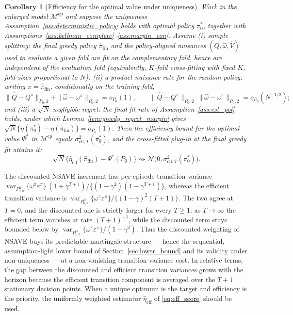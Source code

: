 \documentclass[12pt]{article}
\newtheorem{corollary}[theorem]{Corollary}
\theoremstyle{remark}\newtheorem{remark}[theorem]{Remark}\theoremstyle{plain}
\newcommand{\var}{\operatorname{var}}
\begin{document}
\begin{corollary}[Efficiency for the optimal value under uniqueness]
\label{cor:eff_opt}
    Work in the enlarged model $\mathcal M^{\mathrm{ep}}$ and suppose the
    uniqueness Assumption~\ref{ass:deterministic_policy} holds with
    optimal policy $\pi^*_0$, together with
    Assumptions~\ref{ass:bellman_complete}--\ref{ass:margin_con}.
    Assume \emph{(i) sample splitting:} the final greedy policy
    $\widehat\pi_{\mathrm{fin}}$ and the policy-aligned nuisances
    $(\widehat Q,\widehat\omega,\widehat V)$ used to evaluate a given
    fold are fit on the complementary fold, hence are independent of the
    evaluation fold (equivalently, $K$-fold cross-fitting with fixed
    $K$, fold sizes proportional to $N$);
    \emph{(ii) a product nuisance rate for the random policy:} writing
    $\pi=\widehat\pi_{\mathrm{fin}}$, conditionally on the training
    fold,
    \[
        \|\widehat Q-Q^{\pi}\|_{P_0,2}
        +\|\widehat\omega-\omega^{\pi}\|_{P_0,2}=o_{P_0}(1),
        \qquad
        \|\widehat Q-Q^{\pi}\|_{P_0,2}\,
        \|\widehat\omega-\omega^{\pi}\|_{P_0,2}=o_{P_0}(N^{-1/2});
    \]
    and \emph{(iii) a $\sqrt N$-negligible regret:} the final-fit rate
    of Assumption~\ref{ass:est_pol} holds, under which
    Lemma~\ref{lem:greedy_regret_margin} gives
    $\sqrt N\{\eta(\pi^*_0)-\eta(\widehat\pi_{\mathrm{fin}})\}
    =o_{P_0}(1)$.  Then the efficiency bound for the optimal value
    $\Psi^*$ in $\mathcal M^{\mathrm{ep}}$ equals
    $\sigma^2_{\mathrm{eff},T}(\pi^*_0)$, and the cross-fitted plug-in at
    the final greedy fit attains it:
    \[
        \sqrt N\{\widehat\eta_{\mathrm{eff}}
        (\widehat\pi_{\mathrm{fin}})-\Psi^*(P_0)\}
        \rightsquigarrow
        \mathcal N\big(0,\sigma^2_{\mathrm{eff},T}(\pi^*_0)\big).
    \]
\end{corollary}

The discounted NSAVE increment has per-episode transition variance
$\var_{P_{0,b}^{\mathrm{tr}}}\{\omega^\pi\varepsilon^\pi\}\,
(1+\gamma^{T+1})/\{(1-\gamma^2)(1-\gamma^{T+1})\}$, whereas the efficient
transition variance is
$\var_{P_{0,b}^{\mathrm{tr}}}\{\omega^\pi\varepsilon^\pi\}/
\{(1-\gamma)^2(T+1)\}$.  The two agree at $T=0$, and the discounted one
is strictly larger for every $T\ge1$: as $T\to\infty$ the efficient term
vanishes at rate $(T+1)^{-1}$, while the discounted term stays bounded
below by
$\var_{P_{0,b}^{\mathrm{tr}}}\{\omega^\pi\varepsilon^\pi\}/(1-\gamma^2)$.
Thus the discounted weighting of NSAVE buys its predictable martingale
structure --- hence the sequential, assumption-light lower bound of
Section~\ref{sec:lower_bound} and its validity under non-uniqueness ---
at a non-vanishing transition-variance cost.  In relative terms, the
gap between the discounted and efficient transition variances grows
with the horizon because the efficient transition component is averaged
over the $T+1$ stationary decision points.  When a unique optimum is
the target and efficiency is the priority, the uniformly weighted estimator
$\widehat\eta_{\mathrm{eff}}$ of \eqref{eq:eff_score} should be used.
\end{document}
